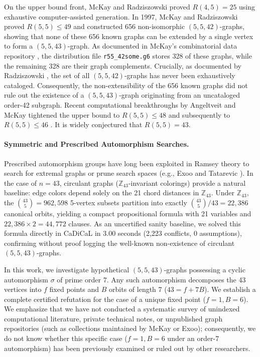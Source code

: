 \documentclass[11pt,a4paper]{article}
\theoremstyle{definition}
\begin{document}
On the upper bound front, McKay and Radziszowski \cite{mckay1995} proved $R(4,5) = 25$ using exhaustive computer-assisted generation. In 1997, McKay and Radziszowski \cite{mckay1997} proved $R(5,5) \le 49$ and constructed 656 non-isomorphic $(5,5,42)$-graphs, showing that none of these 656 known graphs can be extended by a single vertex to form a $(5,5,43)$-graph. As documented in McKay's combinatorial data repository \cite{mckay_ramsey_data}, the distribution file \texttt{r55\_42some.g6} stores 328 of these graphs, while the remaining 328 are their graph complements. Crucially, as documented by Radziszowski \cite{radziszowski2021}, the set of all $(5,5,42)$-graphs has never been exhaustively cataloged. Consequently, the non-extensibility of the 656 known graphs did not rule out the existence of a $(5,5,43)$-graph originating from an uncataloged order-42 subgraph. Recent computational breakthroughs by Angeltveit and McKay tightened the upper bound to $R(5,5) \le 48$ \cite{angeltveit2018} and subsequently to $R(5,5) \le 46$ \cite{angeltveit2024}. It is widely conjectured that $R(5,5) = 43$.

\paragraph{Symmetric and Prescribed Automorphism Searches.}
Prescribed automorphism groups have long been exploited in Ramsey theory to search for extremal graphs or prune search spaces (e.g., Exoo and Tatarevic \cite{exoo2015}). In the case of $n=43$, circulant graphs ($\mathbb{Z}_{43}$-invariant colorings) provide a natural baseline: edge colors depend solely on the 21 chord distances in $\mathbb{Z}_{43}$. Under $\mathbb{Z}_{43}$, the $\binom{43}{5} = 962,598$ 5-vertex subsets partition into exactly $\binom{43}{5} / 43 = 22,386$ canonical orbits, yielding a compact propositional formula with 21 variables and $22,386 \times 2 = 44,772$ clauses. As an uncertified sanity baseline, we solved this formula directly in CaDiCaL in 3.00 seconds (2,223 conflicts, 0 assumptions), confirming without proof logging the well-known non-existence of circulant $(5,5,43)$-graphs.

In this work, we investigate hypothetical $(5,5,43)$-graphs possessing a cyclic automorphism $\sigma$ of prime order 7. Any such automorphism decomposes the 43 vertices into $f$ fixed points and $B$ orbits of length 7 ($43 = f + 7B$). We establish a complete certified refutation for the case of a unique fixed point ($f=1, B=6$). We emphasize that we have not conducted a systematic survey of unindexed computational literature, private technical notes, or unpublished graph repositories (such as collections maintained by McKay or Exoo); consequently, we do not know whether this specific case ($f=1, B=6$ under an order-7 automorphism) has been previously examined or ruled out by other researchers.
\end{document}
